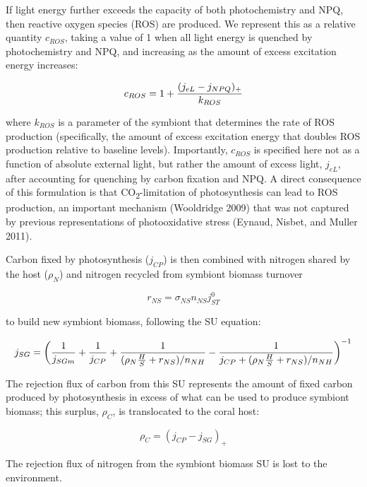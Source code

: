 \documentclass[]{elsarticle} %
\begin{document}
If light energy further exceeds the capacity of both photochemistry and
NPQ, then reactive oxygen species (ROS) are produced. We represent this
as a relative quantity \(c_{ROS}\), taking a value of 1 when all light
energy is quenched by photochemistry and NPQ, and increasing as the
amount of excess excitation energy increases:

\begin{equation} c_{ROS} = 1 + {{(j_{eL} - j_{NPQ})_+} \over k_{ROS}} \end{equation}

where \(k_{ROS}\) is a parameter of the symbiont that determines the
rate of ROS production (specifically, the amount of excess excitation
energy that doubles ROS production relative to baseline levels).
Importantly, \(c_{ROS}\) is specified here not as a function of absolute
external light, but rather the amount of excess light, \(j_{eL}\), after
accounting for quenching by carbon fixation and NPQ. A direct
consequence of this formulation is that CO\textsubscript{2}-limitation
of photosynthesis can lead to ROS production, an important mechanism
(Wooldridge 2009) that was not captured by previous representations of
photooxidative stress (Eynaud, Nisbet, and Muller 2011).

Carbon fixed by photosynthesis (\(j_{CP}\)) is then combined with
nitrogen shared by the host (\(\rho_N\)) and nitrogen recycled from
symbiont biomass turnover

\begin{equation} r_{NS}=\sigma_{NS}n_{NS}j_{ST}^0 \end{equation}

to build new symbiont biomass, following the SU equation:

\begin{equation} j_{SG} = \bigg({1 \over j_{SGm}} + {1 \over j_{CP}} + {1 \over {(\rho_N{H \over S} + r_{NS}) / n_{NH}}} - {1 \over {j_{CP} + (\rho_N{H \over S} + r_{NS}) / n_{NH}}}\bigg)^{-1} \end{equation}

The rejection flux of carbon from this SU represents the amount of fixed
carbon produced by photosynthesis in excess of what can be used to
produce symbiont biomass; this surplus, \(\rho_C\), is translocated to
the coral host:

\begin{equation} \rho_C = (j_{CP} - j_{SG})_+ \end{equation}

The rejection flux of nitrogen from the symbiont biomass SU is lost to
the environment.
\end{document}
